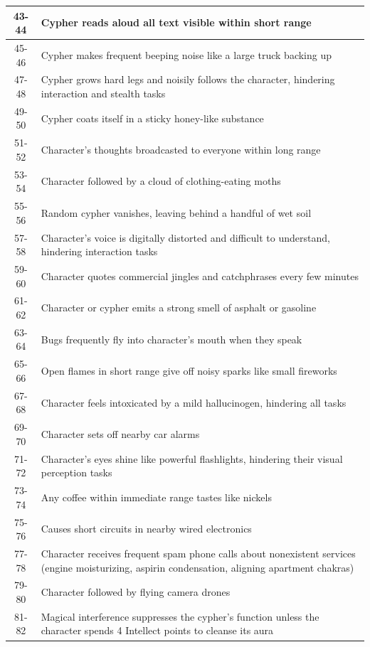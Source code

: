 \begin{longtable}{| c | p{15cm} |}
43-44 & Cypher reads aloud all text visible within short range  \\ \hline
45-46 & Cypher makes frequent beeping noise like a large truck backing up  \\ \hline
47-48 & Cypher grows hard legs and noisily follows the character, hindering interaction and stealth tasks  \\ \hline
49-50 & Cypher coats itself in a sticky honey-like substance  \\ \hline
51-52 & Character’s thoughts broadcasted to everyone within long range  \\ \hline
53-54 & Character followed by a cloud of clothing-eating moths  \\ \hline
55-56 & Random cypher vanishes, leaving behind a handful of wet soil  \\ \hline
57-58 & Character’s voice is digitally distorted and difficult to understand, hindering interaction tasks  \\ \hline
59-60 & Character quotes commercial jingles and catchphrases every few minutes  \\ \hline
61-62 & Character or cypher emits a strong smell of asphalt or gasoline  \\ \hline
63-64 & Bugs frequently fly into character’s mouth when they speak  \\ \hline
65-66 & Open flames in short range give off noisy sparks like small fireworks  \\ \hline
67-68 & Character feels intoxicated by a mild hallucinogen, hindering all tasks  \\ \hline
69-70 & Character sets off nearby car alarms  \\ \hline
71-72 & Character’s eyes shine like powerful flashlights, hindering their visual perception tasks  \\ \hline
73-74 & Any coffee within immediate range tastes like nickels  \\ \hline
75-76 & Causes short circuits in nearby wired electronics  \\ \hline
77-78 & Character receives frequent spam phone calls about nonexistent services (engine moisturizing, aspirin condensation, aligning apartment chakras)  \\ \hline
79-80 & Character followed by flying camera drones  \\ \hline
81-82 & Magical interference suppresses the cypher’s function unless the character spends 4 Intellect points to cleanse its aura  \\ \hline

\end{longtable}
